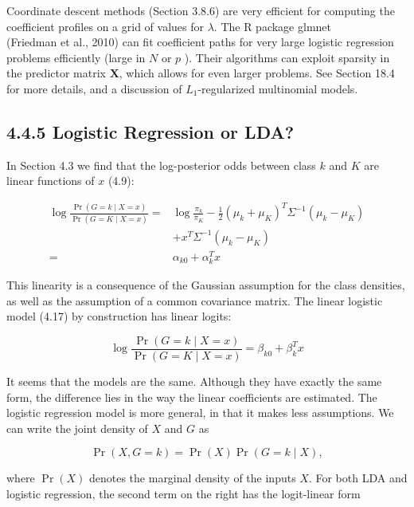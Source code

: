 \documentclass[10pt]{article}
\begin{document}
Coordinate descent methods (Section 3.8.6) are very efficient for computing the coefficient profiles on a grid of values for $\lambda$. The R package glmnet\\
(Friedman et al., 2010) can fit coefficient paths for very large logistic regression problems efficiently (large in $N$ or $p$ ). Their algorithms can exploit sparsity in the predictor matrix $\mathbf{X}$, which allows for even larger problems. See Section 18.4 for more details, and a discussion of $L_{1}$-regularized multinomial models.

\subsection*{4.4.5 Logistic Regression or LDA?}
In Section 4.3 we find that the log-posterior odds between class $k$ and $K$ are linear functions of $x$ (4.9):


\begin{align*}
\log \frac{\operatorname{Pr}(G=k \mid X=x)}{\operatorname{Pr}(G=K \mid X=x)}= & \log \frac{\pi_{k}}{\pi_{K}}-\frac{1}{2}\left(\mu_{k}+\mu_{K}\right)^{T} \Sigma^{-1}\left(\mu_{k}-\mu_{K}\right) \\
& +x^{T} \Sigma^{-1}\left(\mu_{k}-\mu_{K}\right) \\
= & \alpha_{k 0}+\alpha_{k}^{T} x \tag{4.33}
\end{align*}


This linearity is a consequence of the Gaussian assumption for the class densities, as well as the assumption of a common covariance matrix. The linear logistic model (4.17) by construction has linear logits:


\begin{equation*}
\log \frac{\operatorname{Pr}(G=k \mid X=x)}{\operatorname{Pr}(G=K \mid X=x)}=\beta_{k 0}+\beta_{k}^{T} x \tag{4.34}
\end{equation*}


It seems that the models are the same. Although they have exactly the same form, the difference lies in the way the linear coefficients are estimated. The logistic regression model is more general, in that it makes less assumptions. We can write the joint density of $X$ and $G$ as


\begin{equation*}
\operatorname{Pr}(X, G=k)=\operatorname{Pr}(X) \operatorname{Pr}(G=k \mid X), \tag{4.35}
\end{equation*}


where $\operatorname{Pr}(X)$ denotes the marginal density of the inputs $X$. For both LDA and logistic regression, the second term on the right has the logit-linear form
\end{document}
